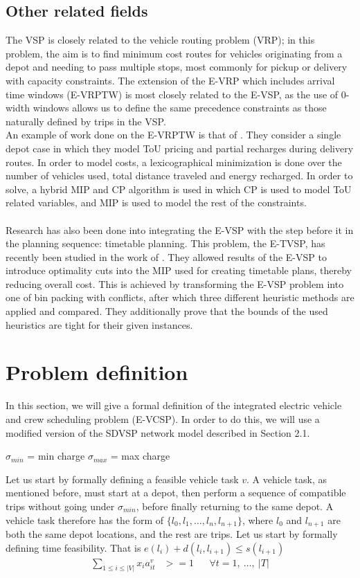 \documentclass[]{article}
\begin{document}
\subsection{Other related fields}
The VSP is closely related to the vehicle routing problem (VRP); in this problem, the aim is to find minimum cost routes for vehicles originating from a depot and needing to pass multiple stops, most commonly for pickup or delivery with capacity constraints. The extension of the E-VRP which includes arrival time windows (E-VRPTW) is most closely related to the E-VSP, as the use of 0-width windows allows us to define the same precedence constraints as those naturally defined by trips in the VSP. \\
An example of work done on the E-VRPTW is that of \citet{Ham2021}. They consider a single depot case in which they model ToU pricing and partial recharges during delivery routes. In order to model costs, a lexicographical minimization is done over the number of vehicles used, total distance traveled and energy recharged. In order to solve, a hybrid MIP and CP algorithm is used in which CP is used to model ToU related variables, and MIP is used to model the rest of the constraints. \\\\
Research has also been done into integrating the E-VSP with the step before it in the planning sequence: timetable planning. This problem, the E-TVSP, has recently been studied in the work of \citet{Stadnichuk2024}. They allowed results of the E-VSP to introduce optimality cuts into the MIP used for creating timetable plans, thereby reducing overall cost. This is achieved by transforming the E-VSP problem into one of bin packing with conflicts, after which three different heuristic methods are applied and compared. They additionally prove that the bounds of the used heuristics are tight for their given instances. 

\section{Problem definition}
\label{sec:problem_def}
In this section, we will give a formal definition of the integrated electric vehicle and crew scheduling problem (E-VCSP). In order to do this, we will use a modified version of the SDVSP network model described in Section 2.1.

$\sigma_{min}$ = min charge
$\sigma_{max}$ = max charge


Let us start by formally defining a feasible vehicle task $v$. A vehicle task, as mentioned before, must start at a depot, then perform a sequence of compatible trips without going under $\sigma_{min}$, before finally returning to the same depot. A vehicle task therefore has the form of $\{ l_0, l_1, \dots, l_n, l_{n+1}\}$, where $l_0$ and $l_{n+1}$ are both the same depot locations, and the rest are trips.
Let us start by formally defining time feasibility. That is $e(l_i) + d(l_i, l_{i+1}) \leq s(l_{i+1})$ 
\begin{align}
  \sum_{1 \leq i \leq |V|} x_{i}a^v_{it} &>= 1 && \forall t = 1,\:\dots,\:|T| \\
\end{align}
\end{document}
